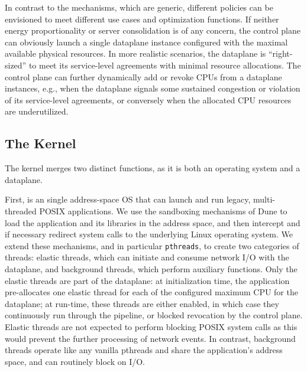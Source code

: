 In contrast to the mechanisms, which are generic, different policies
can be envisioned to meet different use cases and optimization
functions.  If neither energy proportionality or server consolidation
is of any concern, the control plane can obviously launch a single
dataplane instance configured with the maximal available physical
resources.  In more realistic scenarios, the dataplane is
``right-sized'' to meet its service-level agreements with minimal
resource allocations.  The control plane can further dynamically add
or revoke CPUs from a dataplane instances, e.g., when the dataplane
signals some sustained congestion or violation of its service-level
agreements, or conversely when the allocated CPU resources are
underutilized.

%

\subsection{The \ix Kernel}
\label{sec:impl:kernel}

The \ix kernel merges two distinct functions, as it is both an
operating system and a dataplane.



First, \ix is an single address-space OS that can launch and run
legacy, multi-threaded POSIX applications.  We use the sandboxing
mechanisms of Dune to load the application and its libraries in the
address space, and then intercept and if necessary redirect system
calls to the underlying Linux operating system. We extend these
mechanisms, and in particular \texttt{pthreads}, to create two
categories of threads: elastic threads, which can initiate and consume
network I/O with the dataplane, and background threads, which perform
auxiliary functions.  Only the elastic threads are part of the
dataplane: at initialization time, the application pre-allocates one
elastic thread for each of the configured maximum CPU for the
dataplane; at run-time, these threads are either enabled, in which
case they continuously run through the \ix pipeline, or blocked
revocation by the control plane.  Elastic threads are not expected to
perform blocking POSIX system calls as this would prevent the further
processing of network events.  In contrast, background threads operate
like any vanilla pthreads and share the application's address space,
and can routinely block on I/O.

